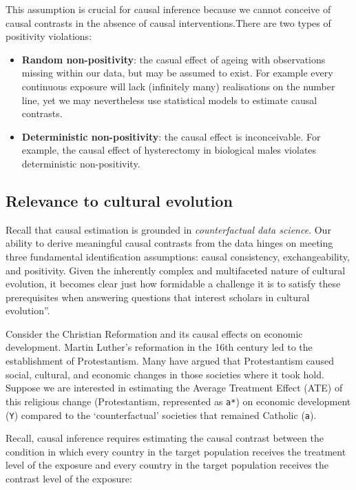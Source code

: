 \documentclass[
  singlecolumn]{report}
\begin{document}
This assumption is crucial for causal inference because we cannot
conceive of causal contrasts in the absence of causal
interventions.There are two types of positivity violations:

\begin{itemize}
\item
  \textbf{Random non-positivity}: the casual effect of ageing with
  observations missing within our data, but may be assumed to exist. For
  example every continuous exposure will lack (infinitely many)
  realisations on the number line, yet we may nevertheless use
  statistical models to estimate causal contrasts.
\item
  \textbf{Deterministic non-positivity}: the causal effect is
  inconceivable. For example, the causal effect of hysterectomy in
  biological males violates deterministic non-positivity.
\end{itemize}

\hypertarget{relevance-to-cultural-evolution}{%
\subsection{Relevance to cultural
evolution}\label{relevance-to-cultural-evolution}}

Recall that causal estimation is grounded in \emph{counterfactual data
science}. Our ability to derive meaningful causal contrasts from the
data hinges on meeting three fundamental identification assumptions:
causal consistency, exchangeability, and positivity. Given the
inherently complex and multifaceted nature of cultural evolution, it
becomes clear just how formidable a challenge it is to satisfy these
prerequisites when answering questions that interest scholars in
cultural evolution''.

Consider the Christian Reformation and its causal effects on economic
development. Martin Luther's reformation in the 16th century led to the
establishment of Protestantism. Many have argued that Protestantism
caused social, cultural, and economic changes in those societies where
it took hold. Suppose we are interested in estimating the Average
Treatment Effect (ATE) of this religious change (Protestantism,
represented as \texttt{a*}) on economic development (\texttt{Y})
compared to the `counterfactual' societies that remained Catholic
(\texttt{a}).

Recall, causal inference requires estimating the causal contrast between
the condition in which every country in the target population receives
the treatment level of the exposure and every country in the target
population receives the contrast level of the exposure:
\end{document}

